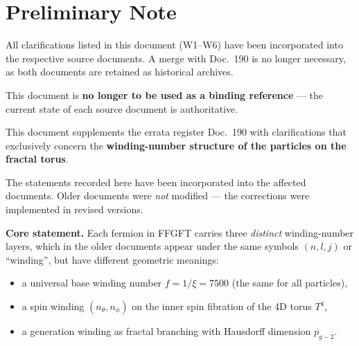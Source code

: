 
\section*{Preliminary Note}

\begin{tcolorbox}[colback=green!5!white, colframe=green!50!black, title={Status: Fully incorporated — May 2026}]
All clarifications listed in this document (W1–W6) have been
incorporated into the respective source documents. A merge with
Doc.~190 is no longer necessary, as both documents are retained
as historical archives.

This document is \textbf{no longer to be used as a binding reference}
— the current state of each source document is authoritative.
\end{tcolorbox}

\bigskip

This document supplements the errata register Doc.~190 with
clarifications that exclusively concern the \textbf{winding-number
structure of the particles on the fractal torus}.

The statements recorded here have been incorporated into the affected
documents. Older documents were \emph{not} modified — the corrections
were implemented in revised versions.

\bigskip

\textbf{Core statement.} Each fermion in FFGFT carries three
\emph{distinct} winding-number layers, which in the older documents
appear under the same symbols $(n,l,j)$ or \enquote{winding}, but
have different geometric meanings:

\begin{itemize}
  \item a universal base winding number $f = 1/\xi = 7500$
        (the same for all particles),
  \item a spin winding $(n_\theta, n_\phi)$ on the inner spin
        fibration of the 4D torus $T^4$,
  \item a generation winding as fractal branching with
        Hausdorff dimension $p_{g\!-\!2}$.
\end{itemize}

